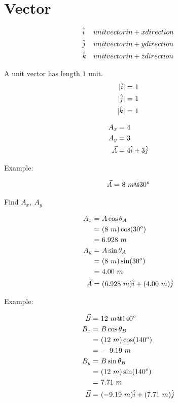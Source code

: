 \section{Vector}


	\begin{align}
		&\hat{i}& &unit vector in +x direction& \notag \\
		&\hat{j}& &unit vector in +y direction& \notag \\
		&\hat{k}& &unit vector in +z direction& \notag
	\end{align}

	A unit vector has length $1$ unit.
	\begin{align}
		|\hat{i}| = \ &1& \notag \\
		|\hat{j}| = \ &1& \notag \\
		|\hat{k}| = \ &1& \notag
	\end{align}

	\begin{align}
		A_{x} = \ &4& \notag \\
		A_{y} = \ &3& \notag \\
		\vec{A} = \ &4\hat{i} + 3\hat{j}& \notag
	\end{align}


	Example:

	\begin{align}
		\vec{A} = \ &8 \ m @ 30^{o}& \notag
	\end{align}

	Find $A_{x}, \ A_{y}$

	\begin{align}
		A_{x} = \ &A \cos \theta_{A}& \notag \\
		= \ &(8 \ m) \cos (30^{o})& \notag \\
		= \ &6.928 \ m& \notag \\
		A_{y} = \ &A \sin \theta_{A}& \notag \\
		= \ &(8 \ m) \sin (30^{o})& \notag \\
		= \ &4.00 \ m& \notag \\
		\vec{A} = \ &(6.928 \ m)\hat{i} + (4.00 \ m)\hat{j}& \notag
	\end{align}

	Example:

	\begin{align}
		\vec{B} = \ &12 \ m @ 140^{o}& \notag \\
		B_{x} = \ &B \cos \theta_{B}& \notag \\
		= \ &(12 \ m) \cos (140^{o})& \notag \\
		= \ &-9.19 \ m& \notag \\
		B_{y} = \ &B \sin \theta_{B}& \notag \\
		= \ &(12 \ m) \sin (140^{o})& \notag \\
		= \ &7.71 \ m& \notag \\
		\vec{B} = \ &(-9.19 \ m)\hat{i} + (7.71 \ m)\hat{j}& \notag
	\end{align}


